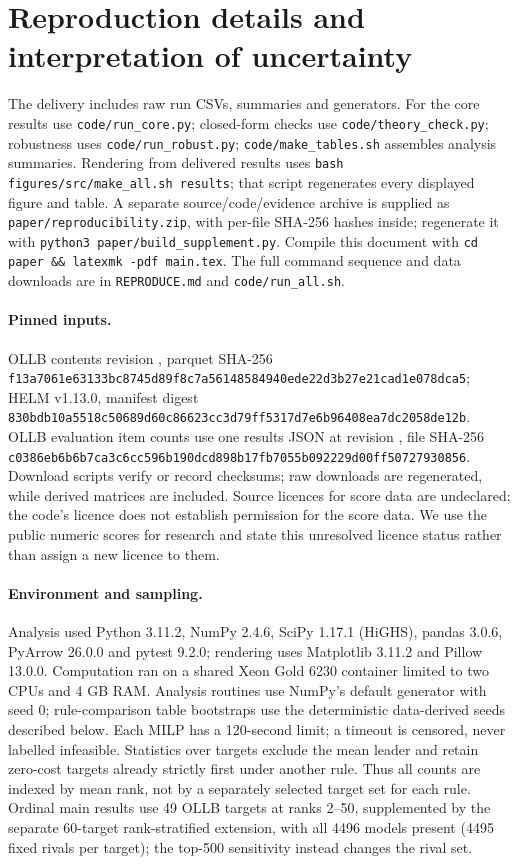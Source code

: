 \documentclass{article}
\begin{document}
\clearpage
\section{Reproduction details and interpretation of uncertainty}
\label{app:repro}
The delivery includes raw run CSVs, summaries and generators. For the core results use \texttt{code/run\_core.py}; closed-form checks use \texttt{code/theory\_check.py}; robustness uses \texttt{code/run\_robust.py}; \texttt{code/make\_tables.sh} assembles analysis summaries. Rendering from delivered results uses \texttt{bash figures/src/make\_all.sh results}; that script regenerates every displayed figure and table. A separate source/code/evidence archive is supplied as \texttt{paper/reproducibility.zip}, with per-file SHA-256 hashes inside; regenerate it with \texttt{python3 paper/build\_supplement.py}. Compile this document with \texttt{cd paper \&\& latexmk -pdf main.tex}. The full command sequence and data downloads are in \texttt{REPRODUCE.md} and \texttt{code/run\_all.sh}.

\paragraph{Pinned inputs.} OLLB contents revision , parquet SHA-256 \texttt{f13a7061e63133bc8745d89f8c7a5614\allowbreak 8584940ede22d3b27e21cad1e078dca5}; HELM v1.13.0, manifest digest \texttt{830bdb10a5518c50689d60c86623cc3d\allowbreak 79ff5317d7e6b96408ea7dc2058de12b}. OLLB evaluation item counts use one results JSON at revision , file SHA-256 \texttt{c0386eb6b6b7ca3c6cc596b190dcd898\allowbreak b17fb7055b092229d00ff50727930856}. Download scripts verify or record checksums; raw downloads are regenerated, while derived matrices are included. Source licences for score data are undeclared; the code's licence does not establish permission for the score data. We use the public numeric scores for research and state this unresolved licence status rather than assign a new licence to them.

\paragraph{Environment and sampling.} Analysis used Python 3.11.2, NumPy 2.4.6, SciPy 1.17.1 (HiGHS), pandas 3.0.6, PyArrow 26.0.0 and pytest 9.2.0; rendering uses Matplotlib 3.11.2 and Pillow 13.0.0. Computation ran on a shared Xeon Gold 6230 container limited to two CPUs and 4 GB RAM. Analysis routines use NumPy's default generator with seed 0; rule-comparison table bootstraps use the deterministic data-derived seeds described below. Each MILP has a 120-second limit; a timeout is censored, never labelled infeasible. Statistics over targets exclude the mean leader and retain zero-cost targets already strictly first under another rule. Thus all counts are indexed by mean rank, not by a separately selected target set for each rule. Ordinal main results use 49 OLLB targets at ranks 2--50, supplemented by the separate 60-target rank-stratified extension, with all 4496 models present (4495 fixed rivals per target); the top-500 sensitivity instead changes the rival set.
\end{document}
